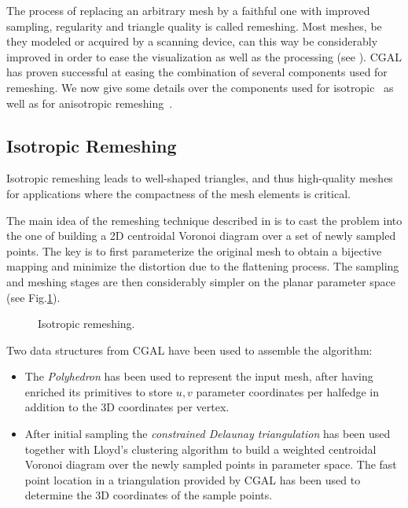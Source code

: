 \label{sec:remeshing}


The process of replacing an arbitrary mesh by a faithful one with
improved sampling, regularity and triangle quality is called
remeshing. Most meshes, be they modeled or acquired by a scanning
device, can this way be considerably improved in order to ease the
visualization as well as the processing (see \cite{ss-dgp-01}). CGAL
has proven successful at easing the combination of several components
used for remeshing. We now give some details over the components used
for isotropic~\cite{acdi-isr-03} as well as for anisotropic
remeshing~\cite{acdld-apr-03}.

\subsection{Isotropic Remeshing}


Isotropic remeshing leads to well-shaped triangles, and thus
high-quality meshes for applications where the compactness of the mesh
elements is critical.


The main idea of the remeshing technique described in
\cite{acdi-isr-03} is to cast the problem into the
one of building a 2D centroidal Voronoi diagram over a set of newly
sampled points. The key is to first parameterize the original mesh to
obtain a bijective mapping and minimize the distortion due to the
flattening process. The sampling and meshing stages are then
considerably simpler on the planar parameter space (see
Fig.\ref{fig:isotropic}).

\begin{figure}
  \centering
  \caption{Isotropic remeshing.}
  \label{fig:isotropic}
\end{figure}



Two data structures from CGAL have been used to assemble the
algorithm:

\begin{itemize}

\item 
The \emph{Polyhedron} has been used to represent the input mesh, after
having enriched its primitives to store $u,v$ parameter coordinates
per halfedge in addition to the 3D coordinates per vertex.

\item 
After initial sampling the \emph{constrained Delaunay triangulation}
has been used together with Lloyd's clustering algorithm to build a
weighted centroidal Voronoi diagram over the newly sampled points in
parameter space. The fast point location in a triangulation provided
by CGAL has been used to determine the 3D coordinates of the sample
points.

\end{itemize}

